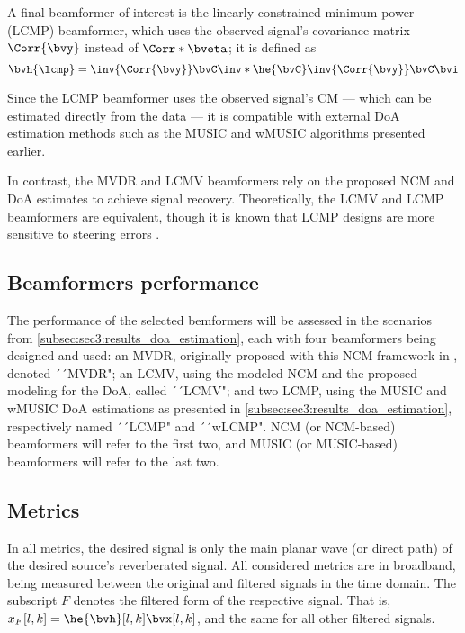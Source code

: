A final beamformer of interest is the linearly-constrained minimum power (LCMP) beamformer, which uses the observed signal’s covariance matrix $\Corr{\bvy}$ instead of $\Corr*{\bveta}$; it is defined as
\begin{equation}
	\bvh{\lcmp} = \inv{\Corr{\bvy}} \bvC \inv*{\he{\bvC} \inv{\Corr{\bvy}} \bvC} \bvi
\end{equation}

Since the LCMP beamformer uses the observed signal’s CM — which can be estimated directly from the data — it is compatible with external DoA estimation methods such as the MUSIC and wMUSIC algorithms presented earlier.

In contrast, the MVDR and LCMV beamformers rely on the proposed NCM and DoA estimates to achieve signal recovery. Theoretically, the LCMV and LCMP beamformers are equivalent, though it is known that LCMP designs are more sensitive to steering errors \cite{vergallo_processing_2012}.


\subsection{Beamformers performance}

The performance of the selected bemformers will be assessed in the scenarios from \cref{subsec:sec3:results_doa_estimation}, each with four beamformers being designed and used: an MVDR, originally proposed with this NCM framework in \cite{moore_compact_2022}, denoted ´´MVDR"; an LCMV, using the modeled NCM and the proposed modeling for the DoA, called ´´LCMV"; and two LCMP, using the MUSIC and wMUSIC DoA estimations as presented in \cref{subsec:sec3:results_doa_estimation}, respectively named ´´LCMP" and ´´wLCMP". NCM (or NCM-based) beamformers will refer to the first two, and MUSIC (or MUSIC-based) beamformers will refer to the last two.

\subsection{Metrics}

In all metrics, the desired signal is only the main planar wave (or direct path) of the desired source's reverberated signal. All considered metrics are in broadband, being measured between the original and filtered signals in the time domain. The subscript $F$ denotes the filtered form of the respective signal. That is, $x_F[l,k] = \he{\bvh}[l,k] \bvx[l,k]$, and the same for all other filtered signals.

